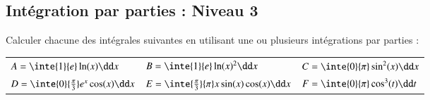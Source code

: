 \documentclass[oneside,12pt]{article}          %
\begin{document}
\subsection{Intégration par parties : Niveau 3}
Calculer chacune des intégrales suivantes en utilisant une ou plusieurs intégrations par parties :

\begin{tabular}{p{} p{} p{}}
	$A=\inte{1}{e}\ln(x)\dd x$ & $B=\inte{1}{e}\ln(x)^2\dd x$ & $C=\inte{0}{\pi}\sin^2(x)\dd x$ \\[5pt]
	$D=\inte{0}{\frac{\pi}{3}}e^x\cos(x)\dd x$ & $E=\inte{\frac{\pi}{3}}{\pi}x\sin(x)\cos(x)\dd x$ & $F=\inte{0}{\pi}\cos^3(t)\dd t$
\end{tabular}
\end{document}
